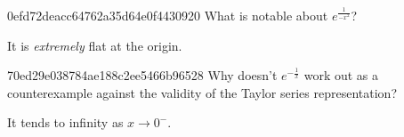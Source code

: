 \begin{note}{0efd72deacc64762a35d64e0f4430920}
    What is notable about \({ e^{\frac{1}{-x^2}} }\)?

    \begin{cloze}{1}
        It is \textit{extremely} flat at the origin.
    \end{cloze}
\end{note}

\begin{note}{70ed29e038784ae188c2ee5466b96528}
    Why doesn't \({ e^{-\frac{1}{x}} }\) work out as a counterexample against the validity of the Taylor series representation?

    \begin{cloze}{1}
        It tends to infinity as \({ x \to 0^{-} }\).
    \end{cloze}
\end{note}


